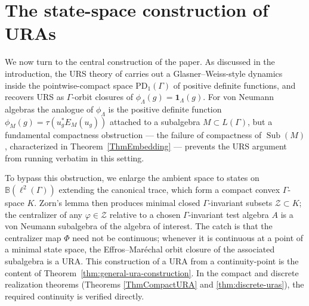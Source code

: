\documentclass[12pt]{amsart} %
\theoremstyle{plain}
\theoremstyle{definition}
\DeclareMathOperator{\Sub}{Sub}
\begin{document}
\section{The state-space construction of URAs}
\label{sec:statespace}
We now turn to the central construction of the paper. As discussed in the introduction, the URS theory of \cite{AJ} carries out a Glasner--Weiss-style dynamics inside the pointwise-compact space $\mathrm{PD}_1(\Gamma)$ of positive definite functions, and recovers URS as $\Gamma$-orbit closures of $\phi_\Lambda(g)=\mathbf{1}_\Lambda(g)$. For von Neumann algebras the analogue of $\phi_\Lambda$ is the positive definite function $\phi_M(g)=\tau(u_g^*E_M(u_g))$ attached to a subalgebra $M\subset L(\Gamma)$, but a fundamental compactness obstruction --- the failure of compactness of $\Sub(M)$, characterized in Theorem~\ref{ThmEmbedding} --- prevents the URS argument from running verbatim in this setting.


To bypass this obstruction, we enlarge the ambient space to states on $\mathbb{B}(\ell^2(\Gamma))$ extending the canonical trace, which form a compact convex $\Gamma$-space $K$. Zorn's lemma then produces minimal closed $\Gamma$-invariant subsets $\mathcal{Z}\subset K$; the centralizer of any $\varphi\in\mathcal{Z}$ relative to a chosen $\Gamma$-invariant test algebra $A$ is a von Neumann subalgebra of the algebra of interest. 
The catch is that the centralizer map $\Phi$ need not be continuous; whenever it is continuous at a point of a minimal state space, the Effros--Mar\'echal orbit closure of the associated subalgebra is a URA. This construction of a URA from a continuity-point is the content of Theorem~\ref{thm:general-ura-construction}. In the compact and discrete realization theorems (Theorems \ref{ThmCompactURA} and \ref{thm:discrete-uras}), the required continuity is verified directly. %
\end{document}

